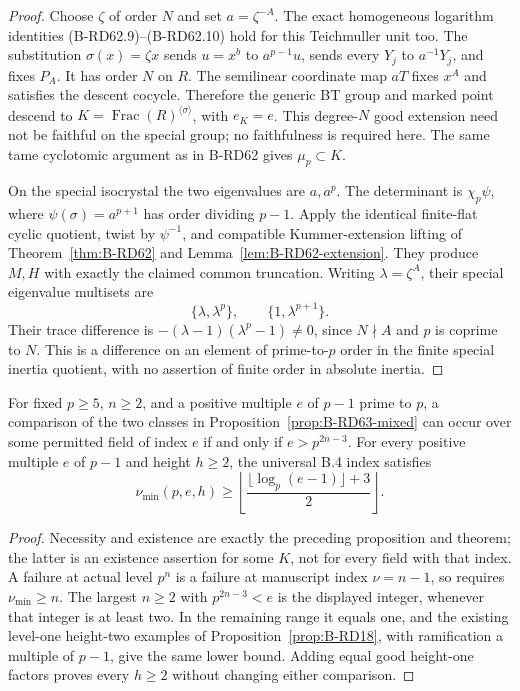 \begin{proof}
Choose $\zeta$ of order $N$ and set $a=\zeta^{-A}$.
The exact homogeneous logarithm identities (B-RD62.9)--(B-RD62.10)
hold for this Teichmuller unit too. The substitution
$\sigma(x)=\zeta x$ sends $u=x^b$ to $a^{p-1}u$, sends every
$Y_j$ to $a^{-1}Y_j$, and fixes $P_A$. It has order $N$ on $R$.
The semilinear coordinate map $aT$ fixes $x^A$ and satisfies
the descent cocycle. Therefore the generic BT group and marked
point descend to $K=\operatorname{Frac}(R)^{\langle\sigma\rangle}$,
with $e_K=e$. This degree-$N$ good extension need not be faithful
on the special group; no faithfulness is required here.
The same tame cyclotomic argument as in B-RD62 gives $\mu_p\subset K$.

On the special isocrystal the two eigenvalues are $a,a^p$.
The determinant is $\chi_p\psi$, where
$\psi(\sigma)=a^{p+1}$ has order dividing $p-1$.
Apply the identical finite-flat cyclic quotient, twist by
$\psi^{-1}$, and compatible Kummer-extension lifting of
Theorem~\ref{thm:B-RD62} and Lemma~\ref{lem:B-RD62-extension}.
They produce $M,H$ with exactly the claimed common truncation.
Writing $\lambda=\zeta^A$, their special eigenvalue multisets are
\[
                       \{\lambda,\lambda^p\},\qquad
                       \{1,\lambda^{p+1}\}.
\]
Their trace difference is $-(\lambda-1)(\lambda^p-1)\ne0$, since
$N\nmid A$ and $p$ is coprime to $N$. This is a difference on
an element of prime-to-$p$ order in the finite special inertia
quotient, with no assertion of finite order in absolute inertia.
\end{proof}

\begin{corollary}
\label{cor:B-RD63}
For fixed $p\ge5$, $n\ge2$, and a positive multiple $e$ of $p-1$
prime to $p$, a comparison of the two classes in
Proposition~\ref{prop:B-RD63-mixed} can occur over some permitted
field of index $e$ if and only if $e>p^{2n-3}$.
For every positive multiple $e$ of $p-1$ and height $h\ge2$,
the universal B.4 index satisfies
\[
 \nu_{\min}(p,e,h)\ge
 \left\lfloor\frac{\lfloor\log_p(e-1)\rfloor+3}{2}\right\rfloor.
                                                               \tag{B-RD63.8}
\]
\end{corollary}
\begin{proof}
Necessity and existence are exactly the preceding proposition
and theorem; the latter is an existence assertion for some $K$,
not for every field with that index. A failure at actual level
$p^n$ is a failure at manuscript index $\nu=n-1$, so requires
$\nu_{\min}\ge n$. The largest $n\ge2$ with
$p^{2n-3}<e$ is the displayed integer, whenever that integer is
at least two. In the remaining range it equals one, and the
existing level-one height-two examples of
Proposition~\ref{prop:B-RD18}, with ramification a multiple of
$p-1$, give the same lower bound. Adding equal good height-one
factors proves every $h\ge2$ without changing either comparison.
\end{proof}

